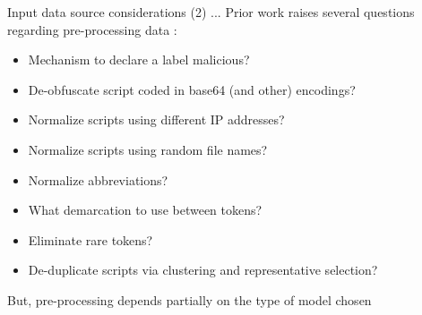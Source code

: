 \documentclass[10pt]{beamer}
\begin{document}
\begin{frame}{Input data source considerations (2) ...}
	Prior work raises several questions regarding pre-processing data \cite{powershell2018,amsi2019,feye2018}:
	\begin{itemize}
		\item Mechanism to declare a label malicious?
		\item De-obfuscate script coded in base64 (and other) encodings?
		\item Normalize scripts using different IP addresses?
		\item Normalize scripts using random file names?
		\item Normalize abbreviations?
		\item What demarcation to use between tokens?
		\item Eliminate rare tokens?
		\item De-duplicate scripts via clustering and representative selection?
	\end{itemize}
	But, pre-processing depends partially on the type of model chosen
\end{frame}
\end{document}

